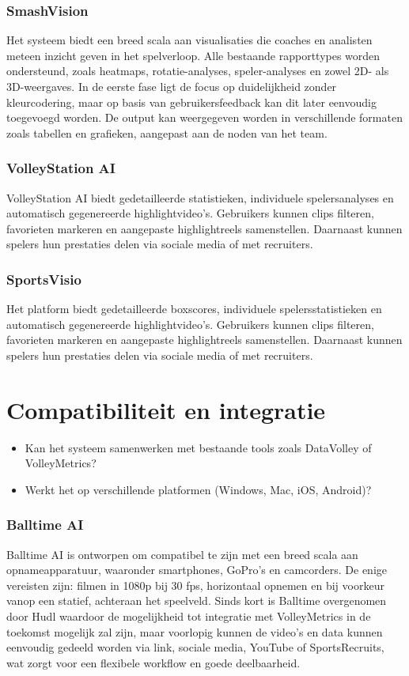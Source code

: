 \subsubsection{SmashVision}
Het systeem biedt een breed scala aan visualisaties die coaches en analisten meteen inzicht geven in het spelverloop. Alle bestaande rapporttypes worden ondersteund, zoals heatmaps, rotatie-analyses, speler-analyses en zowel 2D- als 3D-weergaves. In de eerste fase ligt de focus op duidelijkheid zonder kleurcodering, maar op basis van gebruikersfeedback kan dit later eenvoudig toegevoegd worden. De output kan weergegeven worden in verschillende formaten zoals tabellen en grafieken, aangepast aan de noden van het team.
\subsubsection{VolleyStation AI}
VolleyStation AI biedt gedetailleerde statistieken, individuele spelersanalyses en automatisch gegenereerde highlightvideo's. Gebruikers kunnen clips filteren, favorieten markeren en aangepaste highlightreels samenstellen. Daarnaast kunnen spelers hun prestaties delen via sociale media of met recruiters. 
\subsubsection{SportsVisio}
Het platform biedt gedetailleerde boxscores, individuele spelersstatistieken en automatisch gegenereerde highlightvideo's. Gebruikers kunnen clips filteren, favorieten markeren en aangepaste highlightreels samenstellen. Daarnaast kunnen spelers hun prestaties delen via sociale media of met recruiters.

\section{Compatibiliteit en integratie}
\begin{itemize}
  \item Kan het systeem samenwerken met bestaande tools zoals DataVolley of VolleyMetrics?
  \item Werkt het op verschillende platformen (Windows, Mac, iOS, Android)?
\end{itemize}
\subsubsection{Balltime AI}
Balltime AI is ontworpen om compatibel te zijn met een breed scala aan opnameapparatuur, waaronder smartphones, GoPro’s en camcorders. De enige vereisten zijn: filmen in 1080p bij 30 fps, horizontaal opnemen en bij voorkeur vanop een statief, achteraan het speelveld. Sinds kort is Balltime overgenomen door Hudl waardoor de mogelijkheid tot integratie met VolleyMetrics in de toekomst mogelijk zal zijn, maar voorlopig kunnen de video's en data kunnen eenvoudig gedeeld worden via link, sociale media, YouTube of SportsRecruits, wat zorgt voor een flexibele workflow en goede deelbaarheid.

